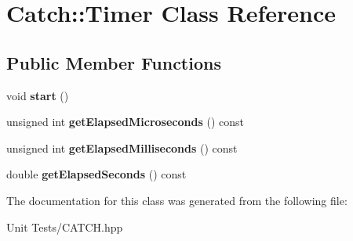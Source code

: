 \hypertarget{classCatch_1_1Timer}{}\section{Catch\+:\+:Timer Class Reference}
\label{classCatch_1_1Timer}
\subsection*{Public Member Functions}
\begin{DoxyCompactItemize}
\item 
void {\bfseries start} ()\hypertarget{classCatch_1_1Timer_a0a56e879e43f36c102bf9ea8b5fc8b72}{}\label{classCatch_1_1Timer_a0a56e879e43f36c102bf9ea8b5fc8b72}

\item 
unsigned int {\bfseries get\+Elapsed\+Microseconds} () const \hypertarget{classCatch_1_1Timer_a4b0062f169f7d3150b0e8073ab37890a}{}\label{classCatch_1_1Timer_a4b0062f169f7d3150b0e8073ab37890a}

\item 
unsigned int {\bfseries get\+Elapsed\+Milliseconds} () const \hypertarget{classCatch_1_1Timer_a4cf3f9fbee9c76e87d989d9bc6913b68}{}\label{classCatch_1_1Timer_a4cf3f9fbee9c76e87d989d9bc6913b68}

\item 
double {\bfseries get\+Elapsed\+Seconds} () const \hypertarget{classCatch_1_1Timer_a8500ef3481a9bf6ae81337972d9f95a3}{}\label{classCatch_1_1Timer_a8500ef3481a9bf6ae81337972d9f95a3}

\end{DoxyCompactItemize}


The documentation for this class was generated from the following file\+:\begin{DoxyCompactItemize}
\item 
Unit Tests/C\+A\+T\+C\+H.\+hpp\end{DoxyCompactItemize}
